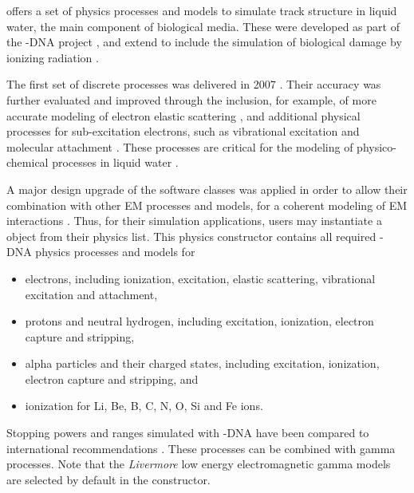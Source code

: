 \Gfour{} offers a set of physics processes and models \cite{embib:dna0} to 
simulate track structure in liquid water, the main component of biological
media.  These were developed as part of the \Gfour{}-DNA project 
\cite{embib:dnaweb}, and extend  
\Gfour{} to include the simulation of biological damage by ionizing radiation
\cite{embib:dna1,embib:dna2}. 

The first set of discrete processes was delivered in 2007 \cite{embib:dnaProc1}.
Their accuracy was further evaluated and improved 
\cite{embib:dnaxs, embib:dnaProc2, embib:dnaProc3} through the inclusion, 
for example, of more accurate modeling of electron elastic scattering
\cite{embib:dnaElast}, and additional physical processes for sub-excitation
electrons, such as vibrational excitation and molecular attachment 
\cite{embib:dnaTS}.  These processes are critical for the modeling of
physico-chemical processes in liquid water \cite{embib:chem:paper1}. 

A major design upgrade of the software classes was applied in order to allow 
their combination with other \Gfour{} EM processes and models, for a coherent 
modeling of EM interactions \cite{bib:uni,embib:dnaPhysList}.  Thus, for 
their simulation applications, users may instantiate a 
 object from their physics list.  This 
physics constructor contains all required \Gfour{}-DNA physics processes and 
models for
\begin{itemize} 
\item electrons, including ionization, excitation, elastic scattering, 
      vibrational excitation and attachment,
\item protons and neutral hydrogen, including excitation, ionization, electron
      capture and stripping,
\item alpha particles and their charged states, including excitation,
      ionization, electron capture and stripping, and  
\item ionization for Li, Be, B, C, N, O, Si and Fe ions.
\end{itemize}
 
Stopping powers and ranges simulated with \Gfour{}-DNA have been compared to
international recommendations \cite{embib:dnaStop}.  These processes can be
combined with \Gfour{} gamma processes.  Note that the \emph{Livermore} low
energy electromagnetic gamma models are selected by default in the 
 constructor. 


